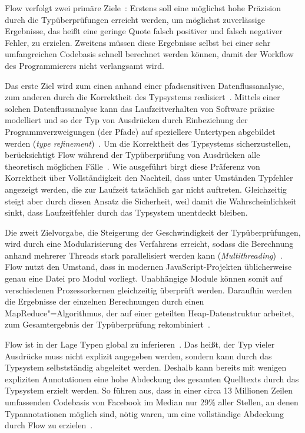 Flow verfolgt zwei primäre Ziele~\autocite{FLOW:TYPE_SYSTEM}: Erstens soll eine möglichst hohe Präzision durch die Typüberprüfungen erreicht werden, um möglichst zuverlässige Ergebnisse, das heißt eine geringe Quote falsch positiver und falsch negativer Fehler, zu erzielen. Zweitens müssen diese Ergebnisse selbst bei einer sehr umfangreichen Codebasis schnell berechnet werden können, damit der Workflow des Programmierers nicht verlangsamt wird.

Das erste Ziel wird zum einen anhand einer pfadsensitiven Datenflussanalyse, zum anderen durch die Korrektheit des Typsystems realisiert~\autocite{FLOW:TYPE_SYSTEM}. Mittels einer solchen Datenflussanalyse kann das Laufzeitverhalten von Software präzise modelliert und so der Typ von Ausdrücken durch Einbeziehung der Programmverzweigungen (der Pfade) auf speziellere Untertypen abgebildet werden (\textit{type refinement})~\cites{WINTER:2013}[2]{FLOW:PAPER}.
Um die Korrektheit des Typsystems sicherzustellen, berücksichtigt Flow während der Typüberprüfung von Ausdrücken alle theoretisch möglichen Fälle~\autocite{FLOW:TYPES_AND_EXPRESSIONS}. Wie ausgeführt birgt diese Präferenz von Korrektheit über Vollständigkeit den Nachteil, dass unter Umständen Typfehler angezeigt werden, die zur Laufzeit tatsächlich gar nicht auftreten. Gleichzeitig steigt aber durch diesen Ansatz die Sicherheit, weil damit die Wahrscheinlichkeit sinkt, dass Laufzeitfehler durch das Typsystem unentdeckt bleiben.

Die zweit Zielvorgabe, die Steigerung der Geschwindigkeit der Typüberprüfungen, wird durch eine Modularisierung des Verfahrens erreicht, sodass die Berechnung anhand mehrerer Threads stark parallelisiert werden kann (\textit{Multithreading})~\autocite[4]{FLOW:PAPER}. Flow nutzt den Umstand, dass in modernen JavaScript-Projekten üblicherweise genau eine Datei pro Modul vorliegt. Unabhängige Module können somit auf verschiedenen Prozessorkernen gleichzeitig überprüft werden. Daraufhin werden die Ergebnisse der einzelnen Berechnungen durch einen MapReduce"=Algorithmus, der auf einer geteilten Heap-Datenstruktur arbeitet, zum Gesamtergebnis der Typüberprüfung rekombiniert~\autocite[22\psq]{FLOW:PAPER}.

Flow ist in der Lage Typen global zu inferieren~\autocite[25]{FLOW:PAPER}. Das heißt, der Typ vieler Ausdrücke muss nicht explizit angegeben werden, sondern kann durch das Typsystem selbstständig abgeleitet werden. Deshalb kann bereits mit wenigen expliziten Annotationen eine hohe Abdeckung des gesamten Quelltexts durch das Typsystem erzielt werden. So führen \citeauthor{FLOW:PAPER} aus, dass in einer circa 13 Millionen Zeilen umfassenden Codebasis von Facebook im Median nur 29\% aller Stellen, an denen Typannotationen möglich sind, nötig waren, um eine vollständige Abdeckung durch Flow zu erzielen~\autocite[24]{FLOW:PAPER}.

